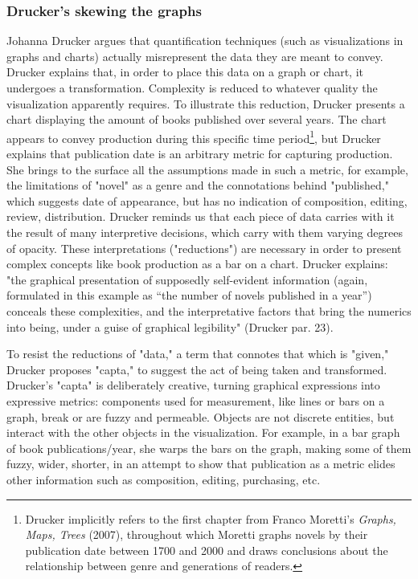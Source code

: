 \documentclass[11pt]{article}
\begin{document}
\subsubsection{Drucker's skewing the graphs}
\label{sec:orgd87e1d0}

Johanna Drucker argues that quantification techniques (such as
visualizations in graphs and charts) actually misrepresent the data
they are meant to convey. Drucker explains that, in order to place
this data on a graph or chart, it undergoes a
transformation. Complexity is reduced to whatever quality the
visualization apparently requires. To illustrate this reduction,
Drucker presents a chart displaying the amount of books published over
several years. The chart appears to convey production during this
specific time period\footnote{Drucker implicitly refers to the first chapter from Franco
Moretti's \emph{Graphs, Maps, Trees} (2007), throughout which Moretti
graphs novels by their publication date between 1700 and 2000 and
draws conclusions about the relationship between genre and generations
of readers.}, but Drucker explains that publication date
is an arbitrary metric for capturing production. She brings to the
surface all the assumptions made in such a metric, for example, the
limitations of "novel" as a genre and the connotations behind
"published," which suggests date of appearance, but has no indication
of composition, editing, review, distribution. Drucker reminds us that
each piece of data carries with it the result of many interpretive
decisions, which carry with them varying degrees of opacity. These
interpretations ("reductions") are necessary in order to present
complex concepts like book production as a bar on a chart. Drucker
explains: "the graphical presentation of supposedly self-evident
information (again, formulated in this example as “the number of
novels published in a year”) conceals these complexities, and the
interpretative factors that bring the numerics into being, under a
guise of graphical legibility" (Drucker par. 23).

To resist the reductions of "data," a term that connotes that which is
"given," Drucker proposes "capta," to suggest the act of being taken
and transformed. Drucker's "capta" is deliberately creative, turning
graphical expressions into expressive metrics: components used for
measurement, like lines or bars on a graph, break or are fuzzy and
permeable. Objects are not discrete entities, but interact with the
other objects in the visualization. For example, in a bar graph of
book publications/year, she warps the bars on the graph, making some
of them fuzzy, wider, shorter, in an attempt to show that publication
as a metric elides other information such as composition, editing,
purchasing, etc.
\end{document}
